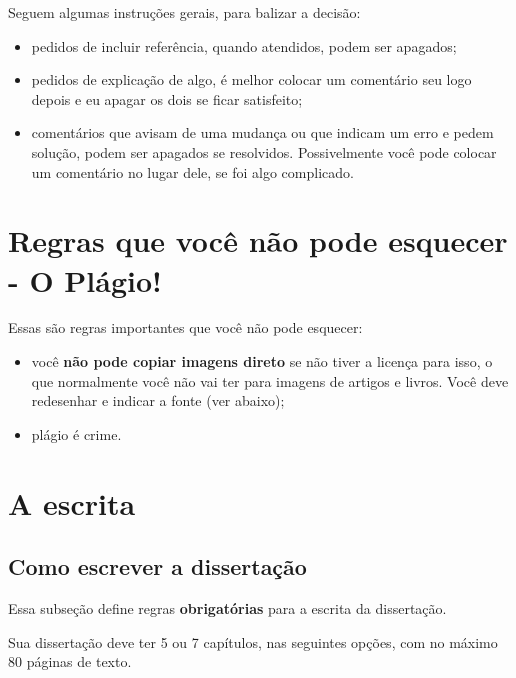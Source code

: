 \documentclass{article}
\begin{document}
Seguem algumas instruções gerais, para balizar a decisão:
\begin{itemize}
    \item pedidos de incluir referência, quando atendidos, podem ser apagados;
    \item pedidos de explicação de algo, é melhor colocar um comentário seu logo depois e eu apagar os dois se ficar satisfeito;
    \item comentários que avisam de uma mudança ou que indicam um erro e pedem solução, podem ser apagados se resolvidos. Possivelmente você pode colocar um comentário no lugar dele, se foi algo complicado.
\end{itemize}

\section{Regras que você não pode esquecer - O Plágio!}

Essas são regras importantes que você não pode esquecer:

\begin{itemize}
    \item você \textbf{não pode copiar imagens direto} se não tiver a licença para isso, o que normalmente você não vai ter para imagens de artigos e livros. Você deve redesenhar e indicar a fonte (ver abaixo);
    \item plágio é crime.
\end{itemize}

\section{A escrita}

\subsection{Como escrever a dissertação}

Essa subseção define regras \textbf{obrigatórias} para a escrita da dissertação.

Sua dissertação deve ter 5 ou 7 capítulos, nas seguintes opções, com no máximo 80 páginas de texto.
\end{document}
